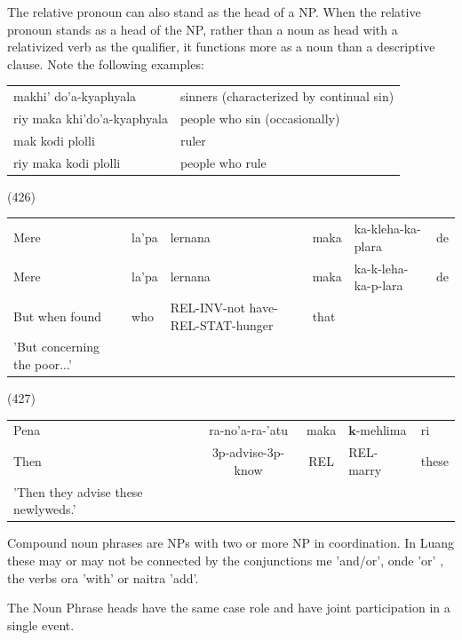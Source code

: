 \documentclass[10pt]{article}
\begin{document}
The relative pronoun can also stand as the head of a NP. When the relative pronoun stands as a head of the NP, rather than a noun as head with a relativized verb as the qualifier, it functions more as a noun than a descriptive clause. Note the following examples:

\begin{center}
\begin{tabular}{ll}
makhi' do'a-kyaphyala & sinners (characterized by continual sin) \\
riy maka khi'do'a-kyaphyala & people who sin (occasionally) \\
mak kodi plolli & ruler \\
riy maka kodi plolli & people who rule \\
\end{tabular}
\end{center}

(426)

\begin{center}
\begin{tabular}{llllll}
Mere & la'pa & lernana & maka & ka-kleha-ka-plara & de \\
Mere & la'pa & lernana & maka & ka-k-leha-ka-p-lara & de \\
But when found & who & REL-INV-not have-REL-STAT-hunger & that &  &  \\
'But concerning the poor...' &  &  &  &  &  \\
\end{tabular}
\end{center}

(427)

\begin{center}
\begin{tabular}{lccll}
Pena & ra-no'a-ra-'atu & maka & \(\boldsymbol{k}\)-mehlima & ri \\
Then & 3p-advise-3p-know & REL & REL-marry & these \\
'Then they advise these newlyweds.' &  &  &  &  \\
\end{tabular}
\end{center}

Compound noun phrases are NPs with two or more NP in coordination. In Luang these may or may not be connected by the conjunctions me 'and/or', onde 'or' , the verbs ora 'with' or naitra 'add'.

The Noun Phrase heads have the same case role and have joint participation in a single event.
\end{document}
